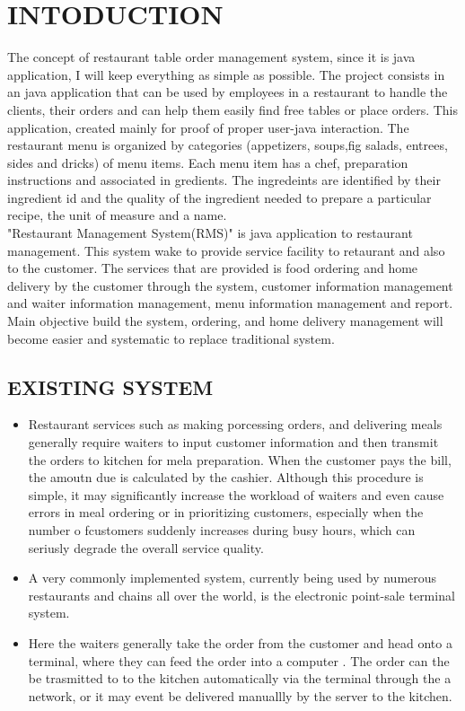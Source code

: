 \documentclass[12pt,a4paper]{article}
\begin{document}
	
	\tableofcontents
	\newpage
	\listoffigures
	\listoftables
	
	\newpage
	
	
	\section{INTODUCTION}
	The concept of restaurant table order management system, since it is java application, I will keep everything as simple as possible. The project consists in an java application that can be used by employees in a restaurant to handle the clients, their orders and can help them easily find free tables or place orders. This application, created mainly for proof of proper user-java interaction. The restaurant menu is organized by categories (appetizers, soups,fig salads, entrees, sides and dricks) of menu items. Each menu item has a chef, preparation instructions and associated in gredients. The ingredeints are identified by their ingredient id and the quality of the ingredient needed to prepare a particular recipe, the unit of measure and a name.
	\\
	"Restaurant Management System(RMS)" is java application to restaurant management. This system wake to provide service facility to retaurant and also to the customer. The services that are provided is food ordering and home delivery by the customer through the system, customer information management and waiter information management, menu information management and report. Main objective build the system, ordering, and home delivery management will become easier and systematic to replace traditional system.
	
	\subsection{EXISTING SYSTEM}
	\begin{itemize}
		\item Restaurant services such as making porcessing orders, and delivering meals generally require waiters to input customer information and then transmit the orders to kitchen for mela preparation. When the customer pays the bill, the amoutn due is calculated by the cashier. Although this procedure is simple, it may significantly increase the workload of waiters and even cause errors in meal ordering or in prioritizing customers, especially when the number o fcustomers suddenly increases during busy hours, which can seriusly degrade the overall service quality.
		\item A very commonly implemented system, currently being used by numerous restaurants and chains all over the world, is the electronic point-sale terminal system.
		\item Here the waiters generally take the order from the customer and head onto a terminal, where they can feed the order into a computer . The order can the be trasmitted to to the kitchen automatically via the terminal through the a network, or it may event be delivered manuallly by the server to the kitchen.
	\end{itemize}
\end{document}
